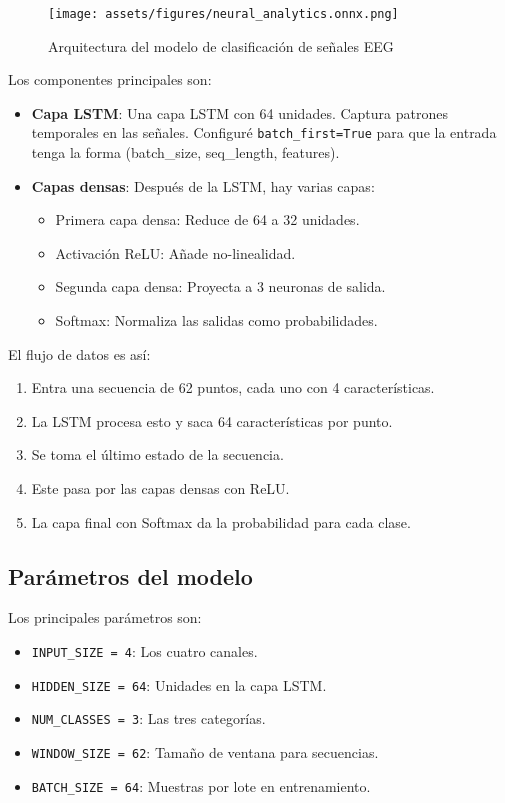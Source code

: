\begin{figure}[ht]
    \centering
    \texttt{[image: assets/figures/neural\_analytics.onnx.png]}
    \caption{Arquitectura del modelo de clasificación de señales EEG}
    \label{fig:model_architecture}
\end{figure}

Los componentes principales son:

\begin{itemize}
    \item \textbf{Capa LSTM}: Una capa LSTM con 64 unidades. Captura patrones temporales en las señales. Configuré \texttt{batch\_first=True} para que la entrada tenga la forma (batch\_size, seq\_length, features).
    
    \item \textbf{Capas densas}: Después de la LSTM, hay varias capas:
    \begin{itemize}
        \item Primera capa densa: Reduce de 64 a 32 unidades.
        \item Activación ReLU: Añade no-linealidad.
        \item Segunda capa densa: Proyecta a 3 neuronas de salida.
        \item Softmax: Normaliza las salidas como probabilidades.
    \end{itemize}
\end{itemize}

El flujo de datos es así:

\begin{enumerate}
    \item Entra una secuencia de 62 puntos, cada uno con 4 características.
    \item La LSTM procesa esto y saca 64 características por punto.
    \item Se toma el último estado de la secuencia.
    \item Este pasa por las capas densas con ReLU.
    \item La capa final con Softmax da la probabilidad para cada clase.
\end{enumerate}

\subsection{Parámetros del modelo}

Los principales parámetros son:

\begin{itemize}
    \item \texttt{INPUT\_SIZE = 4}: Los cuatro canales.
    \item \texttt{HIDDEN\_SIZE = 64}: Unidades en la capa LSTM.
    \item \texttt{NUM\_CLASSES = 3}: Las tres categorías.
    \item \texttt{WINDOW\_SIZE = 62}: Tamaño de ventana para secuencias.
    \item \texttt{BATCH\_SIZE = 64}: Muestras por lote en entrenamiento.
\end{itemize}


